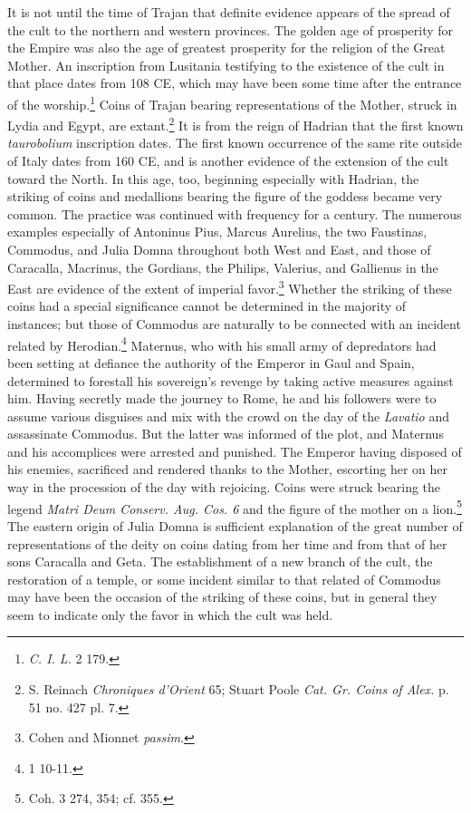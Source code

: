 \documentclass[a4paper, 11pt, oneside, polutonikogreek, french]{article}
\begin{document}
It is not until the time of Trajan that definite evidence appears of the spread of the cult to the northern and western provinces. The golden age of prosperity for the Empire was also the age of greatest prosperity for the religion of the Great Mother. An inscription from Lusitania testifying to the existence of the cult in that place dates from 108 \textsc{CE}, which may have been some time after the entrance of the worship.\footnote{\emph{C. I. L.} 2 179.} Coins of Trajan bearing representations of the Mother, struck in Lydia and Egypt, are extant.\footnote{S. Reinach \emph{Chroniques d'Orient} 65; Stuart Poole \emph{Cat. Gr. Coins of Alex.} p. 51 no. 427 pl. 7.} It is from the reign of Hadrian that the first known \emph{taurobolium} inscription dates. The first known occurrence of the same rite outside of Italy dates from 160 \textsc{CE}, and is another evidence of the extension of the cult toward the North. In this age, too, beginning especially with Hadrian, the striking of coins and medallions bearing the figure of the goddess became very common. The practice was continued with frequency for a century. The numerous examples especially of Antoninus Pius, Marcus Aurelius, the two Faustinas, Commodus, and Julia Domna throughout both West and East, and those of Caracalla, Macrinus, the Gordians, the Philips, Valerius, and Gallienus in the East are evidence of the extent of imperial favor.\footnote{Cohen and Mionnet \emph{passim}.} Whether the striking of these coins had a special significance cannot be determined in the majority of instances; but those of Commodus are naturally to be connected with an incident related by Herodian.\footnote{1 10-11.} Maternus, who with his small army of depredators had been setting at defiance the authority of the Emperor in Gaul and Spain, determined to forestall his sovereign's revenge by taking active measures against him. Having secretly made the journey to Rome, he and his followers were to assume various disguises and mix with the crowd on the day of the \emph{Lavatio} and assassinate Commodus. But the latter was informed of the plot, and Maternus and his accomplices were arrested and punished. The Emperor having disposed of his enemies, sacrificed and rendered thanks to the Mother, escorting her on her way in the procession of the day with rejoicing. Coins were struck bearing the legend \emph{Matri Deum Conserv. Aug. Cos. 6} and the figure of the mother on a lion.\footnote{Coh. 3 274, 354; cf. 355.} The eastern origin of Julia Domna is sufficient explanation of the great number of representations of the deity on coins dating from her time and from that of her sons Caracalla and Geta. The establishment of a new branch of the cult, the restoration of a temple, or some incident similar to that related of Commodus may have been the occasion of the striking of these coins, but in general they seem to indicate only the favor in which the cult was held.
\end{document}

